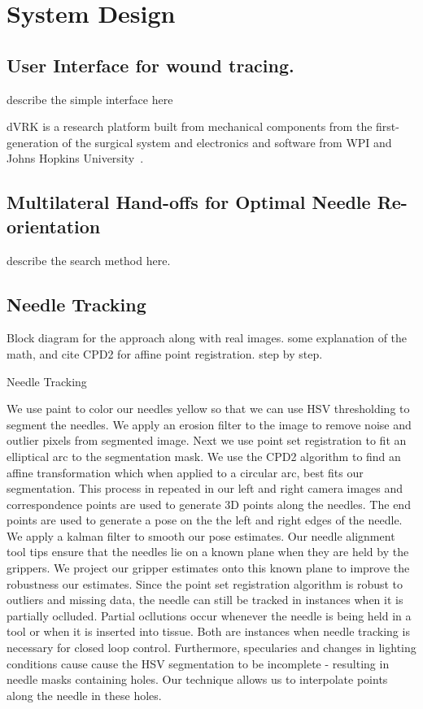 \documentclass[0-suturing.tex]{subfiles}
\begin{document}
\section{System Design}
\label{sec:system}
\subsection{User Interface for wound tracing.}
describe the simple interface here

 dVRK is a research platform built from mechanical components from the first-generation of the \davinci surgical system \cite{Ballantyne2003} and electronics and software from WPI and Johns Hopkins University~\cite{Kazanzides2014}.

\subsection{Multilateral Hand-offs for Optimal Needle Re-orientation}
describe the search method here.  


\subsection{Needle Tracking}
Block diagram for the approach along with real images. 
some explanation of the math, and cite CPD2 for affine point registration. 
step by step.

Needle Tracking

    We use paint to color our needles yellow so that we can use HSV thresholding to
segment the needles. We apply an erosion filter to the image to remove noise and
outlier pixels from segmented image. Next we use point set registration to fit an
elliptical arc to the segmentation mask. We use the CPD2 algorithm to find
an affine transformation which when applied to a circular arc, best fits our
segmentation. This process in repeated in our left and right camera images and
correspondence points are used to generate 3D points along the needles.
The end points are used to generate a pose on the the left and right edges of
the needle. We apply a kalman filter to smooth our pose estimates.
Our needle alignment tool tips ensure that the needles lie on a known plane when
they are held by the grippers. We project our gripper estimates onto this known
plane to improve the robustness our estimates.
    Since the point set registration algorithm is robust to outliers and missing
data, the needle can still be tracked in instances when it is partially oclluded.
Partial ocllutions occur whenever the needle is being held in a tool or when it
is inserted into tissue. Both are instances when needle tracking is necessary
for closed loop control. Furthermore, specularies and changes in lighting conditions
cause cause the HSV segmentation to be incomplete - resulting in needle masks
containing holes. Our technique allows us to interpolate points along the needle
in these holes.
\end{document}
